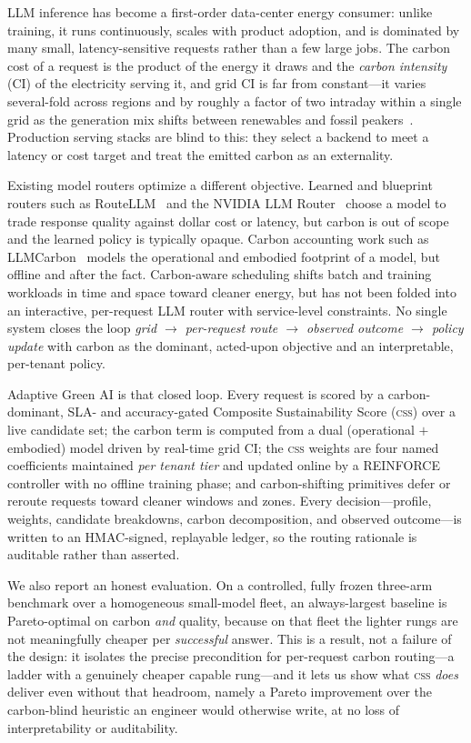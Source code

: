 \documentclass[10pt,twocolumn]{article}
\newcommand{\css}{\textsc{css}}
\begin{document}
LLM inference has become a first-order data-center energy consumer: unlike
training, it runs continuously, scales with product adoption, and is dominated
by many small, latency-sensitive requests rather than a few large jobs. The
carbon cost of a request is the product of the energy it draws and the
\emph{carbon intensity} (CI) of the electricity serving it, and grid CI is far
from constant---it varies several-fold across regions and by roughly a factor
of two intraday within a single grid as the generation mix shifts between
renewables and fossil peakers~\cite{carbon-explorer,wait-awhile}. Production
serving stacks are blind to this: they select a backend to meet a latency or
cost target and treat the emitted carbon as an externality.

Existing model routers optimize a different objective. Learned and
blueprint routers such as RouteLLM~\cite{routellm} and the NVIDIA LLM
Router~\cite{nvidia-llm-router} choose a model to trade response quality
against dollar cost or latency, but carbon is out of scope and the learned
policy is typically opaque. Carbon accounting work such as
LLMCarbon~\cite{llmcarbon} models the operational and embodied footprint of a
model, but offline and after the fact. Carbon-aware scheduling
\cite{ecoserve,carbon-explorer,wait-awhile,carbon-aware-k8s} shifts batch and
training workloads in time and space toward cleaner energy, but has not been
folded into an interactive, per-request LLM router with service-level
constraints. No single system closes the loop \emph{grid $\to$ per-request
route $\to$ observed outcome $\to$ policy update} with carbon as the dominant,
acted-upon objective and an interpretable, per-tenant policy.

Adaptive Green AI is that closed loop. Every request is scored by a
carbon-dominant, SLA- and accuracy-gated Composite Sustainability Score
(\css) over a live candidate set; the carbon term is computed from a
dual (operational $+$ embodied) model driven by real-time grid CI; the \css{}
weights are four named coefficients maintained \emph{per tenant tier} and
updated online by a REINFORCE controller with no offline training phase; and
carbon-shifting primitives defer or reroute requests toward cleaner windows and
zones. Every decision---profile, weights, candidate breakdowns, carbon
decomposition, and observed outcome---is written to an HMAC-signed, replayable
ledger, so the routing rationale is auditable rather than asserted.

We also report an honest evaluation. On a controlled, fully frozen three-arm
benchmark over a homogeneous small-model fleet, an always-largest baseline is
Pareto-optimal on carbon \emph{and} quality, because on that fleet the lighter
rungs are not meaningfully cheaper per \emph{successful} answer. This is a
result, not a failure of the design: it isolates the precise precondition for
per-request carbon routing---a ladder with a genuinely cheaper capable rung---and
it lets us show what \css{} \emph{does} deliver even without that headroom, namely
a Pareto improvement over the carbon-blind heuristic an engineer would otherwise
write, at no loss of interpretability or auditability.
\end{document}
